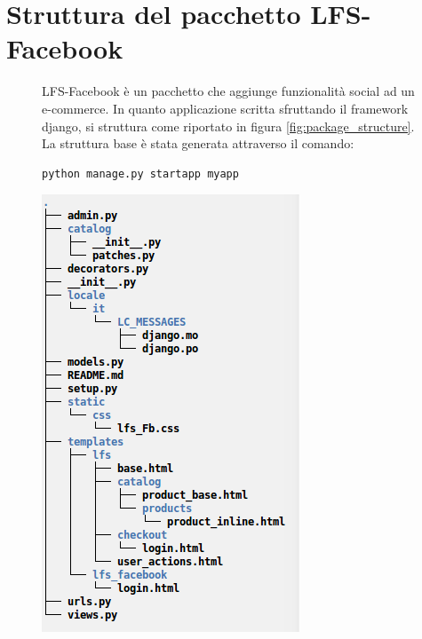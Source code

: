 \section{Struttura del pacchetto LFS-Facebook}
\begin{figure}
LFS-Facebook è un pacchetto che aggiunge funzionalità social ad un e-commerce. In quanto applicazione scritta sfruttando il framework django, si struttura come riportato in figura \ref{fig:package_structure}. La struttura base è stata generata attraverso il comando:
\begin{lstlisting}
python manage.py startapp myapp
\end{lstlisting}
\begin{minipage}{.40\textwidth}
	\includegraphics[width=.90\textwidth]{img/package_structure}

\end{minipage}
\end{figure}
